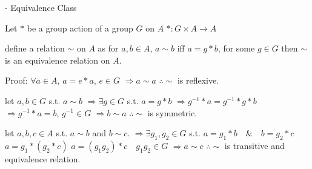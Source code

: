 - Equivalence Class

Let $*$ be a group action of a group $G$ on $A$
$* : G \times A \to A$

define a relation $\sim$ on $A$ as
for $a, b \in A$, $a \sim b$ iff $a = g * b$, for some $g \in G$
then $\sim$ is an equivalence relation on $A$.

Proof: $\forall a \in A$, $a = e * a$, $e \in G$
$\Rightarrow a \sim a$
$\therefore \sim$ is reflexive.

let $a, b \in G$ s.t. $a \sim b$
$\Rightarrow \exists g \in G$ s.t.
$a = g * b$
$\Rightarrow g^{-1} * a = g^{-1} * g * b$
$\Rightarrow g^{-1} * a = b$, $g^{-1} \in G$
$\Rightarrow b \sim a$
$\therefore \sim$ is symmetric.

let $a, b, c \in A$ s.t. $a \sim b$ and $b \sim c$.
$\Rightarrow \exists g_1, g_2 \in G$ s.t.
$a = g_1 * b \quad \& \quad b = g_2 * c$
$a = g_1 * (g_2 * c)$
$a = (g_1 g_2) * c \quad g_1 g_2 \in G$
$\Rightarrow a \sim c$
$\therefore \sim$ is transitive and equivalence relation.

